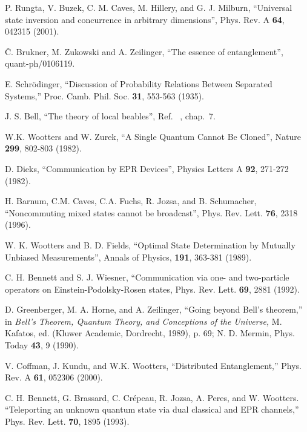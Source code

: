 \documentclass[pra,nofootinbib,showpacs,12pt]{revtex4}
\begin{document}
\begin{thebibliography}{99}
 P. Rungta, V. Buzek, C. M. Caves, M. Hillery, and
G. J. Milburn, ``Universal state inversion and concurrence in arbitrary
dimensions'', Phys. Rev. A \textbf{64}, 042315 (2001).


 \v{C}. Brukner, M. Zukowski and A. Zeilinger, ``The essence of
entanglement'', quant-ph/0106119.

 E. Schr\"{o}dinger, ``Discussion of Probability
Relations Between Separated Systems,'' Proc. Camb. Phil. Soc. \textbf{31},
553-563 (1935).

 J. S. Bell, ``The theory of local beables'', Ref.~%
\cite{Bellbook}, chap.~7.

 W.K. Wootters and W. Zurek, ``A Single Quantum
Cannot Be Cloned'', Nature \textbf{299}, 802-803 (1982).

 D. Dieks, ``Communication by EPR Devices'', Physics Letters
A \textbf{92}, 271-272 (1982).

 H. Barnum, C.M. Caves, C.A. Fuchs, R. Jozsa, and B.
Schumacher, ``Noncommuting mixed states cannot be broadcast'', Phys. Rev.
Lett. \textbf{76}, 2318 (1996).

 W. K. Wootters and B. D. Fields, ``Optimal State
Determination by Mutually Unbiased Measurements'', Annals of Physics,
\textbf{191}, 363-381 (1989).


 C. H. Bennett and S. J. Wiesner, ``Communication via
one- and two-particle operators on Einstein-Podolsky-Rosen states, Phys.
Rev. Lett. \textbf{69}, 2881 (1992).

 D. Greenberger, M. A. Horne, and A. Zeilinger, ``Going beyond
Bell's theorem,'' in \textit{Bell's Theorem, Quantum Theory, and Conceptions
of the Universe, }M. Kafatos, ed. (Kluwer Academic, Dordrecht, 1989), p. 69;
N. D. Mermin, Phys. Today \textbf{43}, 9 (1990).

 V. Coffman, J. Kundu, and W.K. Wootters,
``Distributed Entanglement,'' Phys. Rev. A \textbf{61}, 052306 (2000).

 C. H. Bennett, G. Brassard, C. Cr\'{e}peau, R.
Jozsa, A. Peres, and W. Wootters. ``Teleporting an unknown quantum
state via dual classical and EPR channels,'' Phys. Rev. Lett.
\textbf{70}, 1895 (1993).


\end{thebibliography}
\end{document}
